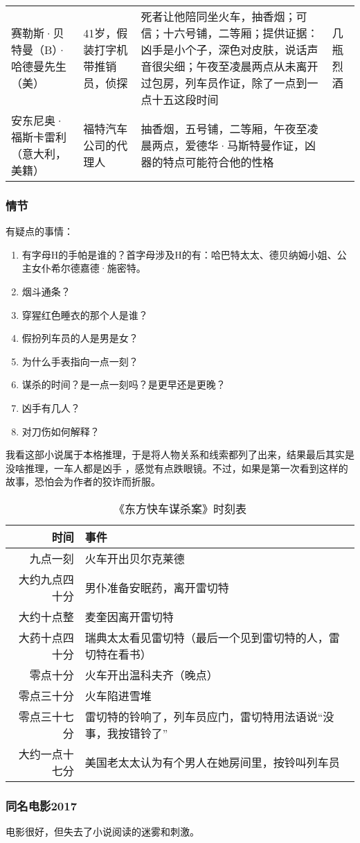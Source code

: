 \begin{longtable}{p{} | p{} | p{} | p{}}
赛勒斯·贝特曼（B）·哈德曼先生（美）	& 41岁，假装打字机带推销员，侦探	& 死者让他陪同坐火车，抽香烟；可信；十六号铺，二等厢；提供证据：凶手是小个子，深色对皮肤，说话声音很尖细；午夜至凌晨两点从未离开过包房，列车员作证，除了一点到一点十五这段时间 &	几瓶烈酒 \\
安东尼奥·福斯卡雷利（意大利，美籍） &	福特汽车公司的代理人	& 抽香烟，五号铺，二等厢，午夜至凌晨两点，爱德华·马斯特曼作证，凶器的特点可能符合他的性格 & \\
\end{longtable}

\subsubsection{情节}

有疑点的事情：
\begin{enumerate}
    \item 有字母H的手帕是谁的？首字母涉及H的有：哈巴特太太、德贝纳姆小姐、公主女仆希尔德嘉德·施密特。
    \item 烟斗通条？
    \item 穿猩红色睡衣的那个人是谁？
    \item 假扮列车员的人是男是女？
    \item 为什么手表指向一点一刻？
    \item 谋杀的时间？是一点一刻吗？是更早还是更晚？
    \item 凶手有几人？
    \item 对刀伤如何解释？
\end{enumerate}

我看这部小说属于本格推理，于是将人物关系和线索都列了出来，结果最后其实是没啥推理，一车人都是凶手 ，感觉有点跌眼镜。不过，如果是第一次看到这样的故事，恐怕会为作者的狡诈而折服。
\begin{table}[tpb]
    \centering
    \caption{《东方快车谋杀案》时刻表}
\begin{tabular}{r|l}
时间 & 事件 \\
\hline
九点一刻 & 火车开出贝尔克莱德 \\
大约九点四十分 & 男仆准备安眠药，离开雷切特 \\
大约十点整 & 麦奎因离开雷切特 \\
大药十点四十分 & 瑞典太太看见雷切特（最后一个见到雷切特的人，雷切特在看书）\\
零点十分 & 火车开出温科夫齐（晚点） \\
零点三十分 & 火车陷进雪堆 \\
零点三十七分 &	雷切特的铃响了，列车员应门，雷切特用法语说“没事，我按错铃了” \\
大约一点十七分 & 美国老太太认为有个男人在她房间里，按铃叫列车员 \\
\end{tabular}
\end{table}

\subsubsection{同名电影2017}
电影很好，但失去了小说阅读的迷雾和刺激。